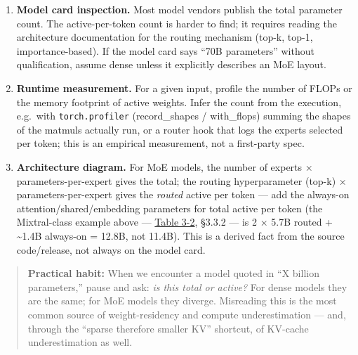 \begin{enumerate}
\def\labelenumi{\arabic{enumi}.}
\item
  \textbf{Model card inspection.} Most model vendors publish the total
  parameter count. The active-per-token count is harder to find; it
  requires reading the architecture documentation for the routing
  mechanism (top-k, top-1, importance-based). If the model card says
  ``70B parameters'' without qualification, assume dense unless it
  explicitly describes an MoE layout.
\item
  \textbf{Runtime measurement.} For a given input, profile the number of
  FLOPs or the memory footprint of active weights. Infer the count from
  the execution, e.g.~with \texttt{torch.profiler} (record\_shapes /
  with\_flops) summing the shapes of the matmuls actually run, or a
  router hook that logs the experts selected per token; this is an
  empirical measurement, not a first-party spec.
\item
  \textbf{Architecture diagram.} For MoE models, the number of experts ×
  parameters-per-expert gives the total; the routing hyperparameter
  (top-k) × parameters-per-expert gives the \emph{routed} active per
  token --- add the always-on attention/shared/embedding parameters for
  total active per token (the Mixtral-class example above --- \hyperref[tab:3.2]{Table 3-2},
  §3.3.2 --- is 2 × 5.7B routed + \textasciitilde1.4B always-on = 12.8B,
  not 11.4B). This is a derived fact from the source code/release, not
  always on the model card.
\end{enumerate}

\begin{quote}
\textbf{Practical habit:} When we encounter a model quoted in ``X
billion parameters,'' pause and ask: \emph{is this total or active?} For
dense models they are the same; for MoE models they diverge. Misreading
this is the most common source of weight-residency and compute
underestimation --- and, through the ``sparse therefore smaller KV''
shortcut, of KV-cache underestimation as well.
\end{quote}

\label{common-mistakes}


